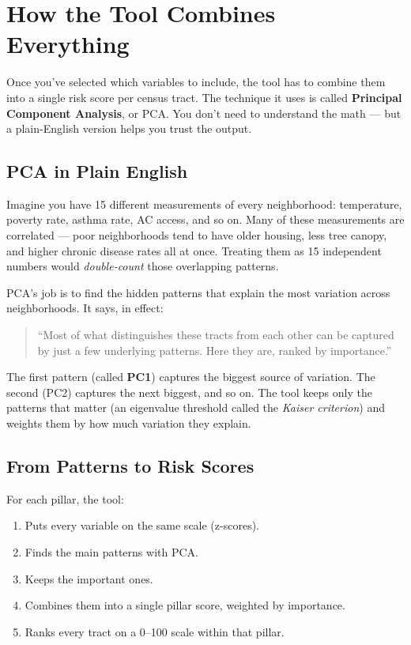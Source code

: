 \documentclass[11pt]{article}
\begin{document}
\section{How the Tool Combines Everything}
\label{sec:pca}

Once you've selected which variables to include, the tool has to combine
them into a single risk score per census tract. The technique it uses is
called \textbf{Principal Component Analysis}, or PCA. You don't need to
understand the math --- but a plain-English version helps you trust the output.

\subsection{PCA in Plain English}

Imagine you have 15 different measurements of every neighborhood: temperature,
poverty rate, asthma rate, AC access, and so on. Many of these measurements
are correlated --- poor neighborhoods tend to have older housing, less tree
canopy, and higher chronic disease rates all at once. Treating them as 15
independent numbers would \textit{double-count} those overlapping patterns.

PCA's job is to find the hidden patterns that explain the most variation
across neighborhoods. It says, in effect:
\begin{quote}
``Most of what distinguishes these tracts from each other can be captured
by just a few underlying patterns. Here they are, ranked by importance.''
\end{quote}

The first pattern (called \textbf{PC1}) captures the biggest source of
variation. The second (PC2) captures the next biggest, and so on. The tool
keeps only the patterns that matter (an eigenvalue threshold called the
\textit{Kaiser criterion}) and weights them by how much variation they explain.

\subsection{From Patterns to Risk Scores}

For each pillar, the tool:
\begin{enumerate}[leftmargin=*]
  \item Puts every variable on the same scale (z-scores).
  \item Finds the main patterns with PCA.
  \item Keeps the important ones.
  \item Combines them into a single pillar score, weighted by importance.
  \item Ranks every tract on a 0--100 scale within that pillar.
\end{enumerate}
\end{document}
